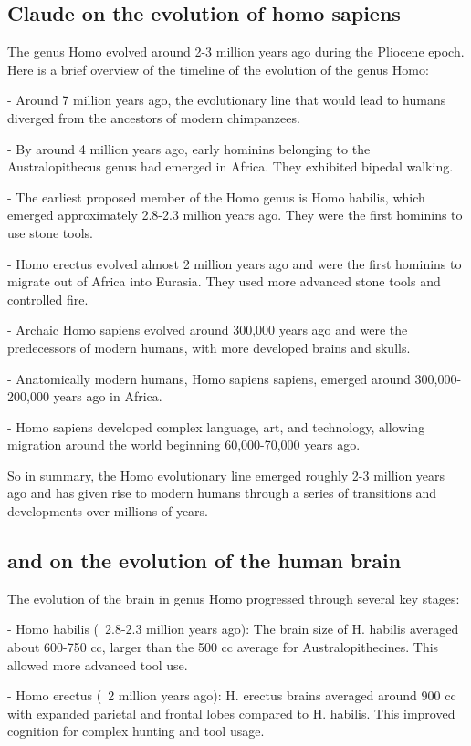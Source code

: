 \documentclass[10pt,titlepage]{book}
\begin{document}
\subsection{Claude on the evolution of homo sapiens}

The genus Homo evolved around 2-3 million years ago during the Pliocene epoch. Here is a brief overview of the timeline of the evolution of the genus Homo:

- Around 7 million years ago, the evolutionary line that would lead to humans diverged from the ancestors of modern chimpanzees. 

- By around 4 million years ago, early hominins belonging to the Australopithecus genus had emerged in Africa. They exhibited bipedal walking.

- The earliest proposed member of the Homo genus is Homo habilis, which emerged approximately 2.8-2.3 million years ago. They were the first hominins to use stone tools.

- Homo erectus evolved almost 2 million years ago and were the first hominins to migrate out of Africa into Eurasia. They used more advanced stone tools and controlled fire.

- Archaic Homo sapiens evolved around 300,000 years ago and were the predecessors of modern humans, with more developed brains and skulls. 

- Anatomically modern humans, Homo sapiens sapiens, emerged around 300,000-200,000 years ago in Africa. 

- Homo sapiens developed complex language, art, and technology, allowing migration around the world beginning 60,000-70,000 years ago.

So in summary, the Homo evolutionary line emerged roughly 2-3 million years ago and has given rise to modern humans through a series of transitions and developments over millions of years.

\subsection{and on the evolution of the human brain}

The evolution of the brain in genus Homo progressed through several key stages:

- Homo habilis (~2.8-2.3 million years ago): The brain size of H. habilis averaged about 600-750 cc, larger than the 500 cc average for Australopithecines. This allowed more advanced tool use.

- Homo erectus (~2 million years ago): H. erectus brains averaged around 900 cc with expanded parietal and frontal lobes compared to H. habilis. This improved cognition for complex hunting and tool usage.
\end{document}
